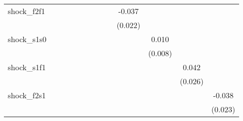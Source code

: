 {\begin{tabular}{l*{12}{c}}
\addlinespace
shock\_f2f1  &                     &                     &                     &                     &                     &                     &                     &                     &      -0.037         &                     &                     &                     \\
            &                     &                     &                     &                     &                     &                     &                     &                     &     (0.022)         &                     &                     &                     \\
\addlinespace
shock\_s1s0  &                     &                     &                     &                     &                     &                     &                     &                     &                     &       0.010         &                     &                     \\
            &                     &                     &                     &                     &                     &                     &                     &                     &                     &     (0.008)         &                     &                     \\
\addlinespace
shock\_s1f1  &                     &                     &                     &                     &                     &                     &                     &                     &                     &                     &       0.042         &                     \\
            &                     &                     &                     &                     &                     &                     &                     &                     &                     &                     &     (0.026)         &                     \\
\addlinespace
shock\_f2s1  &                     &                     &                     &                     &                     &                     &                     &                     &                     &                     &                     &      -0.038         \\
            &                     &                     &                     &                     &                     &                     &                     &                     &                     &                     &                     &     (0.023)         \\

\end{tabular}}
